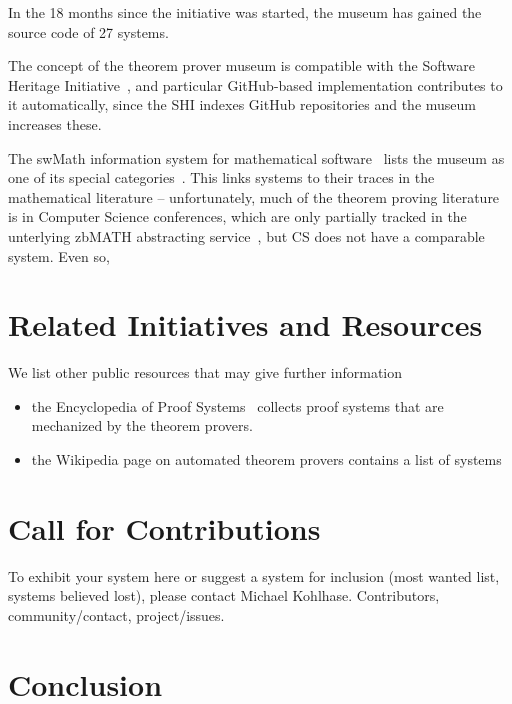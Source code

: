 \documentclass[smallcondensed]{svjour3}
\begin{document}
In the 18 months since the initiative was started, the museum has gained the source code
of 27 systems.

The concept of the theorem prover museum is compatible with the Software Heritage
Initiative~\cite{SoftwareHeritage:on}, and particular GitHub-based implementation
contributes to it automatically, since the SHI indexes GitHub repositories and the museum
increases these.

The \textsf{swMath} information system for mathematical software~\cite{swMath:on} lists
the museum as one of its special categories~\cite{swMath:tpmuseum:on}. This links systems
to their traces in the mathematical literature -- unfortunately, much of the theorem
proving literature is in Computer Science conferences, which are only partially tracked in
the unterlying \textsf{zbMATH} abstracting service~\cite{zbMATH:on}, but CS does not have
a comparable system. Even so, 

\section{Related Initiatives and Resources}
We list other public resources that may give further information
\begin{itemize}
\item the Encyclopedia of Proof Systems~\cite{Wolzenlogel-Paleo:teps17} collects proof
  systems that are mechanized by the theorem provers.
\item the Wikipedia page on automated theorem provers contains a list of systems
\end{itemize}

\section{Call for Contributions}

To exhibit your system here or suggest a system for inclusion (most wanted
list, systems believed lost), please contact Michael Kohlhase. Contributors,
community/contact, project/issues.

\section{Conclusion}\label{sec:concl}

\begin{acknowledgements}
\end{acknowledgements}

\printbibliography
\end{document}
